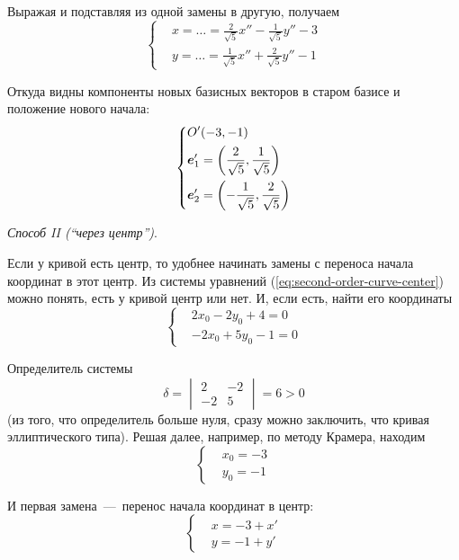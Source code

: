 \documentclass[a4paper,12pt]{article}
\begin{document}
\begin{solution}
    Выражая и подставляя из одной замены в другую, получаем
    \[
      \left\{
        \begin{aligned}
          &x = \ldots = \frac{2}{\sqrt{5}}x'' - \frac{1}{\sqrt{5}}y'' - 3\\
          &y = \ldots = \frac{1}{\sqrt{5}}x'' + \frac{2}{\sqrt{5}}y'' - 1
        \end{aligned}
      \right.
    \]
    
    Откуда видны компоненты новых базисных векторов в старом базисе и положение нового начала:
    \[
      \left\{
        \begin{aligned}
          &O'(-3, -1)\\
          &\boldsymbol e_1' = \left(\frac{2}{\sqrt{5}}, \frac{1}{\sqrt{5}}\right)\\
          &\boldsymbol e_2' = \left(-\frac{1}{\sqrt{5}}, \frac{2}{\sqrt{5}}\right)
        \end{aligned}
      \right.
    \]
    
    
    \emph{Способ II (``через центр'')}.
    
    Если у кривой есть центр, то удобнее начинать замены с переноса начала координат в этот центр.
    Из системы уравнений (\ref{eq:second-order-curve-center}) можно понять, есть у кривой центр или нет.
    И, если есть, найти его координаты
    \[
      \left\{
        \begin{aligned}
          &2x_0 - 2y_0 + 4 = 0\\
          &-2x_0 + 5y_0 - 1 = 0
        \end{aligned}
      \right.
    \]
    
    Определитель системы
    \[
      \delta = \begin{vmatrix}2 & -2 \\ -2 & 5\end{vmatrix} = 6 > 0
    \]
    (из того, что определитель больше нуля, сразу можно заключить, что кривая эллиптического типа).
    Решая далее, например, по методу Крамера, находим
    \[
      \left\{
        \begin{aligned}
          &x_0 = -3\\
          &y_0 = -1
        \end{aligned}
      \right.
    \]
    
    И первая замена~---~перенос начала координат в центр:
    \[
      \left\{
        \begin{aligned}
          &x = -3 + x'\\
          &y = -1 + y'
        \end{aligned}
      \right.
    \]
    

\end{solution}
\end{document}
